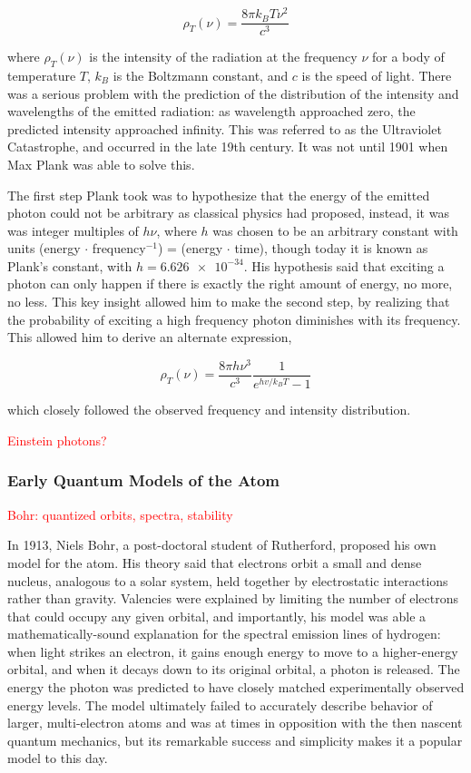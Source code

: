 \begin{equation*}
	\rho_{T}(\nu) = \frac{8\pi k_{B}T\nu^{2}}{c^{3}}
\end{equation*}

\noindent where \(\rho_{T}(\nu)\) is the intensity of the radiation at the frequency \(\nu\) for a body of temperature \(T\), \(k_{B}\) is the Boltzmann constant, and \(c\) is the speed of light. There was a serious problem with the prediction of the distribution of the intensity and wavelengths of the emitted radiation: as wavelength approached zero, the predicted intensity approached infinity. This was referred to as the Ultraviolet Catastrophe, and occurred in the late 19th century. It was not until 1901 when Max Plank was able to solve this.

The first step Plank took was to hypothesize that the energy of the emitted photon could not be arbitrary as classical physics had proposed, instead, it was was integer multiples of \(h\nu\), where \(h\) was chosen to be an arbitrary constant with units (energy \(\cdot\) frequency\(^{-1}\)) = (energy \(\cdot\) time), though today it is known as Plank's constant, with \(h = \num{6.626e-34}\). His hypothesis said that exciting a photon can only happen if there is exactly the right amount of energy, no more, no less. This key insight allowed him to make the second step, by realizing that the probability of exciting a high frequency photon diminishes with its frequency. This allowed him to derive an alternate expression,

\begin{equation*}
	\rho_{T}(\nu) = \frac{8\pi h\nu^{3}}{c^{3}} \frac{1}{e^{hv/k_{B}T} - 1}
\end{equation*}

\noindent which closely followed the observed frequency and intensity distribution.

\textcolor{red}{Einstein photons?}

\subsubsection{Early Quantum Models of the Atom}

\textcolor{red}{Bohr: quantized orbits, spectra, stability}

In 1913, Niels Bohr, a post-doctoral student of Rutherford, proposed his own model for the atom. His theory said that electrons orbit a small and dense nucleus, analogous to a solar system, held together by electrostatic interactions rather than gravity. Valencies were explained by limiting the number of electrons that could occupy any given orbital, and importantly, his model was able a mathematically-sound explanation for the spectral emission lines of hydrogen: when light strikes an electron, it gains enough energy to move to a higher-energy orbital, and when it decays down to its original orbital, a photon is released. The energy the photon was predicted to have closely matched experimentally observed energy levels. The model ultimately failed to accurately describe behavior of larger, multi-electron atoms and was at times in opposition with the then nascent quantum mechanics, but its remarkable success and simplicity makes it a popular model to this day.

